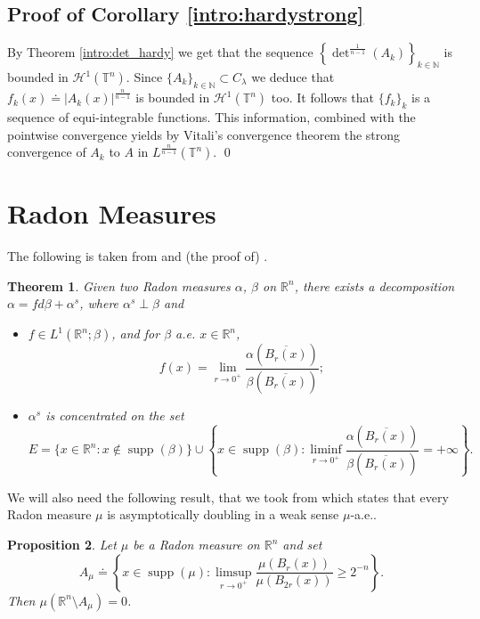 \documentclass[10pt,reqno]{amsart}
\numberwithin{equation}{section}
\newcommand{\R}{\mathbb{R}}
\newcommand{\T}{\mathbb{T}}
\newcommand{\N}{\mathbb{N}}
\DeclareMathOperator{\spt}{supp}
\theoremstyle{plain}
\newtheorem{Teo}{Theorem}[section]
\newtheorem{prop}[Teo]{Proposition}
\theoremstyle{definition}
\theoremstyle{remark}
\begin{document}
\subsection{Proof of Corollary \ref{intro:hardystrong}}

By Theorem \ref{intro:det_hardy} we get that the sequence $\left\{\det^{\frac{1}{n-1}}(A_k)\right\}_{k\in \N}$ is bounded in $\mathcal{H}^1(\T^n)$. Since $\{A_k\}_{k\in \N}\subset  C_\lambda$ we deduce that $f_k(x)\doteq |A_k(x)|^\frac{n}{n-1}$ is  bounded in $\mathcal{H}^1(\T^n)$ too. It follows that $\{f_k\}_{k}$ is a sequence of equi-integrable functions. This information, combined with the pointwise convergence yields by Vitali's convergence theorem the strong convergence of $A_k$ to $A$ in $L^\frac{n}{n-1}(\T^n)$. \qed

\appendix

\section{Radon Measures}\label{AppA}

The following is taken from \cite[Thm. 5.8]{MAG} and (the proof of) \cite[Thm. 2.17]{PMA}.

\begin{Teo}\label{RNdec}
Given two Radon measures $\alpha$, $\beta$ on $\R^n$, there exists a decomposition $\alpha = fd\beta + \alpha^s$, where $\alpha^s \perp \beta$ and 
\begin{itemize}
\item $f \in L^1(\R^n;\beta)$, and for $\beta$ a.e. $x \in \R^n$,
\[
f(x) = \lim_{r \to 0^+}\frac{\alpha(\overline{B_r(x)})}{\beta(\overline{B_r(x)})};
\]
\item $\alpha^s$ is concentrated on the set 
\[
E = \{x \in \R^n: x \notin \spt(\beta)\}\cup \left\{x \in \spt(\beta): \liminf_{r \to 0^+}\frac{\alpha(\overline{B_r(x)})}{\beta(\overline{B_r(x)})} = + \infty\right\}.
\]
\end{itemize}
\end{Teo}


We will also need the following result, that we took from \cite[Lemma 4.11]{DLDPHM} which states that every Radon measure $\mu$ is asymptotically doubling in a weak sense $\mu$-a.e..


\begin{prop}\label{asdoub}
Let $\mu$ be a Radon measure on $\R^n$ and set
\[
A_{\mu} \doteq \left\{x \in \spt(\mu): \limsup_{r \to 0^+}\frac{\mu(B_r(x))}{\mu(B_{2r}(x))} \ge 2^{-n}\right\}.
\]
Then $\mu(\R^n \setminus A_\mu) = 0$.
\end{prop}
\end{document}
